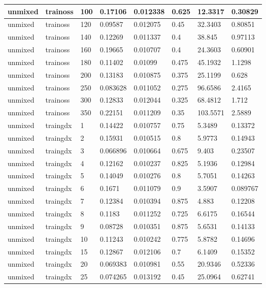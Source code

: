 \begin{longtable}{llllllll}
unmixed & trainoss & 100 & 0.17106 & 0.012338 & 0.625 & 12.3317 & 0.30829 \\ \hline 
unmixed & trainoss & 120 & 0.09587 & 0.012075 & 0.45 & 32.3403 & 0.80851 \\ \hline 
unmixed & trainoss & 140 & 0.12269 & 0.011337 & 0.4 & 38.845 & 0.97113 \\ \hline 
unmixed & trainoss & 160 & 0.19665 & 0.010707 & 0.4 & 24.3603 & 0.60901 \\ \hline 
unmixed & trainoss & 180 & 0.11402 & 0.01099 & 0.475 & 45.1932 & 1.1298 \\ \hline 
unmixed & trainoss & 200 & 0.13183 & 0.010875 & 0.375 & 25.1199 & 0.628 \\ \hline 
unmixed & trainoss & 250 & 0.083628 & 0.011052 & 0.275 & 96.6586 & 2.4165 \\ \hline 
unmixed & trainoss & 300 & 0.12833 & 0.012044 & 0.325 & 68.4812 & 1.712 \\ \hline 
unmixed & trainoss & 350 & 0.22151 & 0.011209 & 0.35 & 103.5571 & 2.5889 \\ \hline 
unmixed & traingdx & 1 & 0.14422 & 0.010757 & 0.75 & 5.3489 & 0.13372 \\ \hline 
unmixed & traingdx & 2 & 0.15931 & 0.010515 & 0.8 & 5.9773 & 0.14943 \\ \hline 
unmixed & traingdx & 3 & 0.066896 & 0.010664 & 0.675 & 9.403 & 0.23507 \\ \hline 
unmixed & traingdx & 4 & 0.12162 & 0.010237 & 0.825 & 5.1936 & 0.12984 \\ \hline 
unmixed & traingdx & 5 & 0.14049 & 0.010276 & 0.8 & 5.7051 & 0.14263 \\ \hline 
unmixed & traingdx & 6 & 0.1671 & 0.011079 & 0.9 & 3.5907 & 0.089767 \\ \hline 
unmixed & traingdx & 7 & 0.12384 & 0.010394 & 0.875 & 4.883 & 0.12208 \\ \hline 
unmixed & traingdx & 8 & 0.1183 & 0.011252 & 0.725 & 6.6175 & 0.16544 \\ \hline 
unmixed & traingdx & 9 & 0.08728 & 0.010351 & 0.875 & 5.6531 & 0.14133 \\ \hline 
unmixed & traingdx & 10 & 0.11243 & 0.010242 & 0.775 & 5.8782 & 0.14696 \\ \hline 
unmixed & traingdx & 15 & 0.12867 & 0.012106 & 0.7 & 6.1409 & 0.15352 \\ \hline 
unmixed & traingdx & 20 & 0.069383 & 0.010981 & 0.55 & 20.9346 & 0.52336 \\ \hline 
unmixed & traingdx & 25 & 0.074265 & 0.013192 & 0.45 & 25.0964 & 0.62741 \\ \hline 

\end{longtable}
